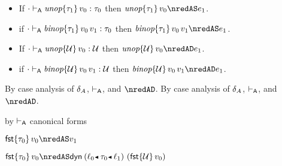\begin{lemma}\label{A-delta-type-progress}\leavevmode
  \begin{itemize}
    \item
      If\/ ${\cdot} \vdash_{\mathsf{A}} \textit{unop}{\{\tau_1\}}\,v_0 : \tau_0$
      then\/ $\eunopt{\stype_1}{\svalue_0} \nredAS \sexpr_1$.
    \item
      if\/ ${\cdot} \vdash_{\mathsf{A}} \textit{binop}{\{\tau_1\}}\,v_0\,v_1 : \tau_0$
      then\/ $\ebinopt{\stype_1}{\svalue_0}{\svalue_1} \nredAS \sexpr_1$.
    \item
      If\/ ${\cdot} \vdash_{\mathsf{A}} \textit{unop}{\{{\mathcal U}\}}\,v_0 : {\mathcal U}$
      then\/ $\eunopt{\tdyn}{\svalue_0} \nredAD \sexpr_1$.
    \item
      if\/ ${\cdot} \vdash_{\mathsf{A}} \textit{binop}{\{{\mathcal U}\}}\,v_0\,v_1 : {\mathcal U}$
      then\/ $\ebinopt{\tdyn}{\svalue_0}{\svalue_1} \nredAD \sexpr_1$.
  \end{itemize}
\end{lemma}{
  \newcommand{\shortpf}{By case analysis of $\sdeltaA$, $\sWTA$, and $\nredAD$.}
\begin{lamportproof*}
  \shortpf
\mainproof
  \shortpf

    \begin{pfproof}
        \begin{pfproof}
          by $\vdash_{\mathsf{A}}$ canonical forms
        \end{pfproof}
        \begin{pfproof}
          \qedstep
            \begin{pfproof}
              $\efst{\stype_0}{\svalue_0} \nredAS \svalue_1$
            \end{pfproof}
        \end{pfproof}
        \begin{pfproof}
          \qedstep
            \begin{pfproof}
              $\efst{\stype_0}{\svalue_0} \nredAS \edynb{\obnd{\sowner_0}{\stype_0}{\sowner_1}}{(\efst{\tdyn}{\svalue_0})}$
            \end{pfproof}
        \end{pfproof}
    \end{pfproof}


\end{lamportproof*}}
